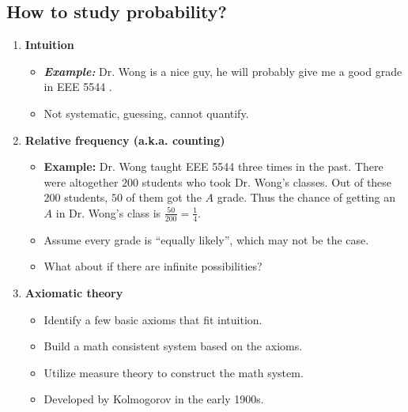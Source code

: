 \subsection{How to study probability?}
\begin{enumerate}
\item \textbf{Intuition}
\begin{itemize}
\item \emph{\bf{Example:}} Dr. Wong is a nice guy, he will probably give me a good grade in EEE 5544 .
\item Not systematic, guessing, cannot quantify.
\end{itemize}

\item \textbf{Relative frequency (a.k.a. counting)} 
\begin{itemize}
\item \textbf{Example:} Dr. Wong taught EEE 5544 three times in the
  past. There were altogether $200$ students who took Dr. Wong's
  classes. Out of these $200$ students, $50$ of them got the \(A\) grade.
  Thus the chance of getting an \(A\) in Dr. Wong's class is
  \(\frac{50}{200}=\frac{1}{4}\).
\item Assume every grade is ``equally likely'', which may not be the case.
\item What about if there are infinite possibilities?
\end{itemize}

\item \textbf{Axiomatic theory} 
\begin{itemize}
  \item Identify a few basic axioms that fit intuition.
  \item Build a math consistent system based on the axioms.
  \item Utilize measure theory to construct the math system.
  \item Developed by Kolmogorov in the early 1900s.
\end{itemize}
\end{enumerate}
